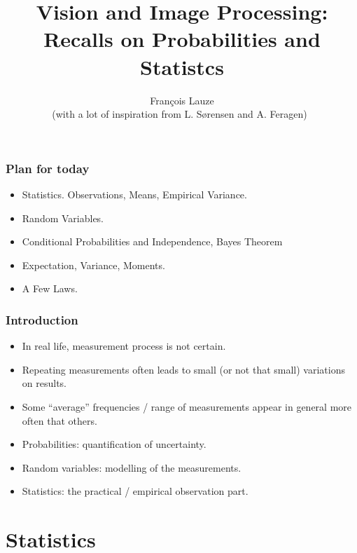 \documentclass[9pt]{beamer}
\title{Vision and Image Processing:\\ Recalls on Probabilities and Statistcs}
\author[F.~Lauze] %
{Fran{\c c}ois Lauze \\
  {
    \small (with a lot of inspiration from L. S{\o}rensen and A. Feragen)~\\
  }
}
\institute[DIKU] %
{
  Department of Computer Science\\
  University of Copenhagen
}
\date[2015-16 B2] %
\begin{document}
\maketitle









\begin{frame}
  \frametitle{Plan for today}
  \begin{itemize}
  \item Statistics. Observations, Means, Empirical Variance.
  \item Random Variables.
  \item Conditional Probabilities and Independence, Bayes Theorem
  \item Expectation, Variance, Moments.
  \item A Few Laws.
  \end{itemize}
\end{frame}

\begin{frame}\frametitle{Introduction}
  \begin{itemize}
  \item In real life, measurement process is not certain. 
  \item Repeating measurements often leads to small (or not that small) variations on results.
  \item Some ``average'' frequencies / range of measurements appear in general more often that others.
  \item Probabilities: quantification of uncertainty.
  \item Random variables: modelling of the measurements.
  \item Statistics: the practical / empirical observation part.
  \end{itemize}
\end{frame}


\section{Statistics}
\end{document}
